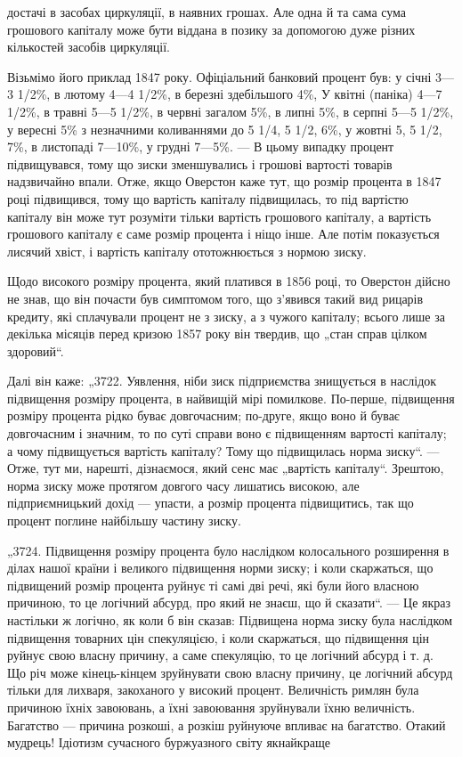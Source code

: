 достачі в засобах циркуляції, в наявних грошах. Але одна й та сама
сума грошового капіталу може бути віддана в позику за допомогою дуже різних кількостей засобів
циркуляції.

Візьмімо його приклад 1847 року. Офіціальний банковий процент був: у січні 3—3 1/2\%, в лютому 4—4
1/2\%, в березні здебільшого 4\%, У квітні (паніка) 4—7 1/2\%, в травні 5—5 1/2\%, в червні загалом 5\%,
в липні 5\%, в серпні 5—5 1/2\%, у вересні 5\% з незначними
коливаннями до 5 1/4, 5 1/2, 6\%, у жовтні 5, 5 1/2, 7\%, в листопаді 7—10\%, у грудні 7—5\%. — В цьому
випадку процент підвищувався,
тому що зиски зменшувались і грошові вартості товарів надзвичайно впали. Отже, якщо Оверстон каже
тут, що розмір процента
в 1847 році підвищився, тому що вартість капіталу підвищилась,
то під вартістю капіталу він може тут розуміти тільки вартість
грошового капіталу, а вартість грошового капіталу є саме розмір
процента і ніщо інше. Але потім показується лисячий хвіст,
і вартість капіталу ототожнюється з нормою зиску.

Щодо високого розміру процента, який платився в 1856 році,
то Оверстон дійсно не знав, що він почасти був симптомом того,
що з’явився такий вид рицарів кредиту, які сплачували процент
не з зиску, а з чужого капіталу; всього лише за декілька місяців
перед кризою 1857 року він твердив, що „стан справ цілком
здоровий“.

Далі він каже: „3722. Уявлення, ніби зиск підприємства знищується в наслідок підвищення розміру
процента, в найвищій
мірі помилкове. По-перше, підвищення розміру процента рідко
буває довгочасним; по-друге, якщо воно й буває довгочасним
і значним, то по суті справи воно є підвищенням вартості капіталу; а чому підвищується вартість
капіталу? Тому що підвищилась норма зиску“. — Отже, тут ми, нарешті, дізнаємося,
який сенс має „вартість капіталу“. Зрештою, норма зиску може
протягом довгого часу лишатись високою, але підприємницький
дохід — упасти, а розмір процента підвищитись, так що процент поглине найбільшу частину зиску.

„3724. Підвищення розміру процента було наслідком колосального
розширення в ділах нашої країни і великого підвищення норми зиску; і коли скаржаться, що підвищений
розмір
процента руйнує ті самі дві речі, які були його власною причиною, то це логічний абсурд, про який не
знаєш, що й сказати“. — Це якраз настільки ж логічно, як коли б він сказав:
Підвищена норма зиску була наслідком підвищення товарних
цін спекуляцією, і коли скаржаться, що підвищення цін руйнує
свою власну причину, а саме спекуляцію, то це логічний абсурд
і т. д. Що річ може кінець-кінцем зруйнувати свою власну причину, це логічний абсурд тільки для
лихваря, закоханого у високий процент. Величність римлян була причиною їхніх завоювань,
а їхні завоювання зруйнували їхню величність. Багатство — причина
розкоші, а розкіш руйнуюче впливає на багатство. Отакий
мудрець! Ідіотизм сучасного буржуазного світу якнайкраще
